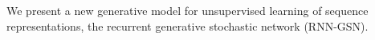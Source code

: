 We present a new generative model for unsupervised learning of sequence representations, the recurrent generative stochastic network (RNN-GSN).